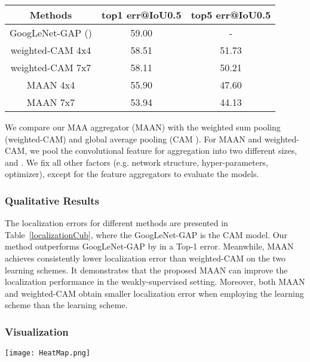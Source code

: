\documentclass{article} \usepackage{iclr2019_conference,times}
\begin{document}
\begin{table*}[t]
\centering
\caption{ Localization error on CUB-200-2011 test set}
\begin{tabular}{c|c|c}
\hline
Methods          & top1 err@IoU0.5 & top5 err@IoU0.5 \\ \hline
GoogLeNet-GAP (\citep{zhou2016cvpr})              & 59.00   & -           \\ \hline
weighted-CAM 4x4  & 58.51         & 51.73               \\ weighted-CAM 7x7  & 58.11          & 50.21              \\ 
MAAN 4x4        & 55.90         & 47.60               \\
MAAN 7x7          & 53.94          & 44.13               \\ \hline \end{tabular}
\label{localizationCub}
\end{table*}
We compare our MAA aggregator (MAAN) with the weighted sum pooling (weighted-CAM) and global average pooling (CAM \citep{zhou2016cvpr}). For MAAN and weighted-CAM, we pool the convolutional feature for aggregation into two different sizes,  and . 
We fix all other factors (e.g. network structure, hyper-parameters, optimizer), except for the feature aggregators to evaluate the models. 

\subsubsection{Qualitative Results}

The localization errors for different methods are presented in Table~\ref{localizationCub}, where the GoogLeNet-GAP is the CAM model. Our method outperforms GoogLeNet-GAP by  in a Top-1 error. Meanwhile, MAAN achieves consistently lower localization error than weighted-CAM on the two learning schemes. It demonstrates that the proposed MAAN can improve the localization performance in the weakly-supervised setting. Moreover, both MAAN and weighted-CAM obtain smaller localization error when employing the  learning scheme than the  learning scheme. 





\subsubsection{Visualization}




\begin{figure*}[t!]
\centering
\texttt{[image: HeatMap.png]}\caption{Comparison with the baseline methods. The proposed MAAN can locate larger object regions to improve localization performance (ground-truth bounding boxes are in red and the predicted ones are in green).}
\label{fig:loc}
\end{figure*}
\end{document}
